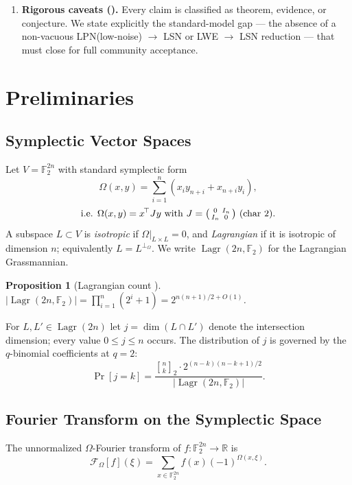 \documentclass[11pt,a4paper]{article}
\theoremstyle{plain}
\newtheorem{proposition}[theorem]{Proposition}
\theoremstyle{definition}
\newcommand{\F}{\mathbb{F}}
\DeclareMathOperator{\Lagr}{Lagr}
\newcommand{\R}{\mathbb{R}}
\begin{document}
\begin{enumerate}
    \item \textbf{Rigorous caveats ().} Every claim is classified as theorem, evidence, or conjecture. We state explicitly the standard-model gap --- the absence of a non-vacuous LPN(low-noise) $\to$ LSN or LWE $\to$ LSN reduction --- that must close for full community acceptance.
\end{enumerate}

\section{Preliminaries}
\label{sec:prelim}

\subsection{Symplectic Vector Spaces}
\label{subsec:symplectic}

Let $V = \F_2^{2n}$ with standard symplectic form
\[
\Omega(x,y) = \sum_{i=1}^n (x_i y_{n+i} + x_{n+i} y_i),
\]
\[
\text{i.e. } \Omega(x,y) = x^{\!\top} J y \text{ with } J = \begin{psmallmatrix} 0 & I_n \\ I_n & 0 \end{psmallmatrix} \text{ (char 2)}.
\]
A subspace $L \subset V$ is \emph{isotropic} if $\Omega|_{L \times L} = 0$, and \emph{Lagrangian} if it is isotropic of dimension $n$; equivalently $L = L^{\perp_\Omega}$. We write $\Lagr(2n, \F_2)$ for the Lagrangian Grassmannian.

\begin{proposition}[Lagrangian count \cite{Mac71}]
$|\Lagr(2n, \F_2)| = \prod_{i=1}^n (2^i + 1) = 2^{n(n+1)/2 + O(1)}$.
\end{proposition}

For $L, L' \in \Lagr(2n)$ let $j = \dim(L \cap L')$ denote the intersection dimension; every value $0 \le j \le n$ occurs. The distribution of $j$ is governed by the $q$-binomial coefficients at $q=2$:
\begin{equation}
\label{eq:j-distribution}
\Pr[j=k] = \frac{{n \brack k}_2 \cdot 2^{(n-k)(n-k+1)/2}}{|\Lagr(2n,\F_2)|}.
\end{equation}

\subsection{Fourier Transform on the Symplectic Space}
\label{subsec:fourier}

The unnormalized $\Omega$-Fourier transform of $f \colon \F_2^{2n} \to \R$ is
\[
\mathcal{F}_\Omega[f](\xi) = \sum_{x \in \F_2^{2n}} f(x) (-1)^{\Omega(x, \xi)}.
\]
\end{document}
